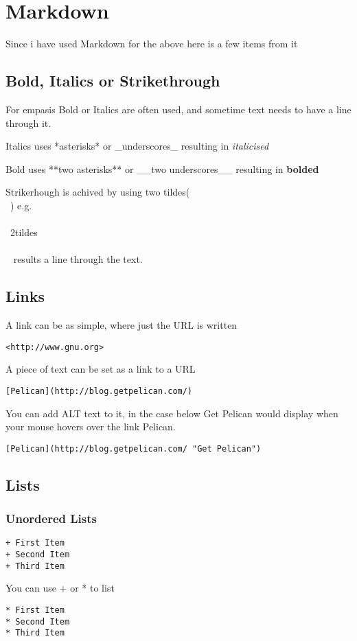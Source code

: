 \documentclass[12pt]{article}			%
\begin{document}
\newpage
\section{Markdown}
Since i have used Markdown for the above here is a few items from it

\subsection{Bold, Italics or Strikethrough}
For empasis Bold or Italics are often used, and sometime text needs to have a line through it.\par
Italics uses *asterisks* or \_underscores\_ resulting in \textit{italicised} \par
Bold uses **two asterisks** or \_\_two underscores\_\_ resulting in \textbf{bolded} \par


Strikerhough is achived by using two tildes(\\~) e.g. \\~\\~2tildes\\~\\~ results a line through the text.

\subsection{Links}
A link can be as simple, where just the URL is written 
\begin{verbatim}
<http://www.gnu.org>
\end{verbatim}
A piece of text can be set as a link to a URL
\begin{verbatim}
[Pelican](http://blog.getpelican.com/)
\end{verbatim}
You can add ALT text to it, in the case below Get Pelican would display when your mouse hovers over the link Pelican.
\begin{verbatim}
[Pelican](http://blog.getpelican.com/ "Get Pelican")
\end{verbatim}
\subsection{Lists}
\subsubsection{Unordered Lists}
\begin{verbatim}
+ First Item
+ Second Item
+ Third Item
\end{verbatim}
You can use + or * to list
\begin{verbatim}
* First Item
* Second Item
* Third Item
\end{verbatim}
\end{document}
